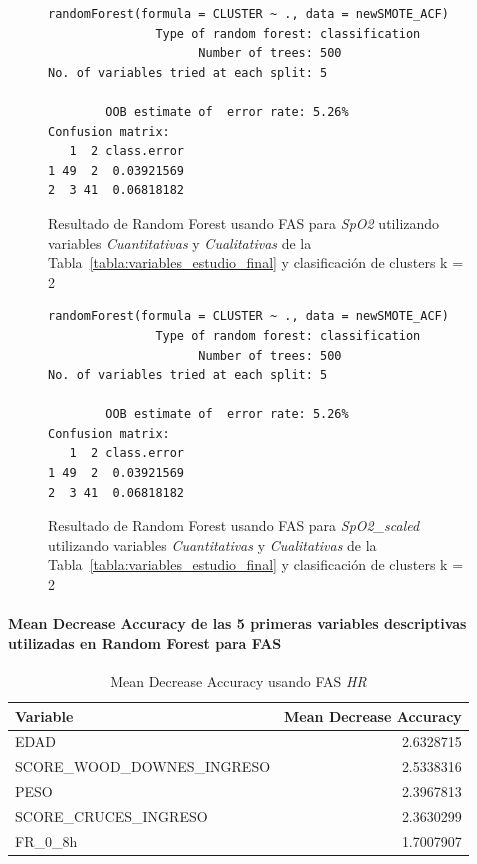 \begin{figure}[H]
    \centering
    \begin{lstlisting}[frame=single, basicstyle=\small\ttfamily]
        randomForest(formula = CLUSTER ~ ., data = newSMOTE_ACF) 
               Type of random forest: classification
                     Number of trees: 500
No. of variables tried at each split: 5

        OOB estimate of  error rate: 5.26%
Confusion matrix:
   1  2 class.error
1 49  2  0.03921569
2  3 41  0.06818182
    \end{lstlisting}
    \caption{Resultado de Random Forest usando FAS para \textit{SpO2} utilizando variables \textit{Cuantitativas} y \textit{Cualitativas} de la Tabla~\ref{tabla:variables_estudio_final} y clasificación de clusters k = 2}\label{fig:random_forest_acf_result_4}
\end{figure}
\begin{figure}[H]
    \centering
    \begin{lstlisting}[frame=single, basicstyle=\small\ttfamily]
        randomForest(formula = CLUSTER ~ ., data = newSMOTE_ACF) 
               Type of random forest: classification
                     Number of trees: 500
No. of variables tried at each split: 5

        OOB estimate of  error rate: 5.26%
Confusion matrix:
   1  2 class.error
1 49  2  0.03921569
2  3 41  0.06818182
    \end{lstlisting}
    \caption{Resultado de Random Forest usando FAS para \textit{SpO2\_scaled} utilizando variables \textit{Cuantitativas} y \textit{Cualitativas} de la Tabla~\ref{tabla:variables_estudio_final} y clasificación de clusters k = 2}
    \label{fig:random_forest_acf_result_5}
\end{figure}

\paragraph{Mean Decrease Accuracy de las 5 primeras variables descriptivas utilizadas en Random Forest para FAS}

\begin{table}[H]
    \centering
    \begin{tabular}{lr}
        \toprule
        \textbf{Variable} & \textbf{Mean Decrease Accuracy} \\
        \midrule
        EDAD & 2.6328715 \\
        SCORE\_WOOD\_DOWNES\_INGRESO & 2.5338316 \\
        PESO & 2.3967813 \\
        SCORE\_CRUCES\_INGRESO & 2.3630299 \\
        FR\_0\_8h & 1.7007907 \\
        \bottomrule
    \end{tabular}
    \caption{Mean Decrease Accuracy usando FAS \textit{HR}}
\end{table}

